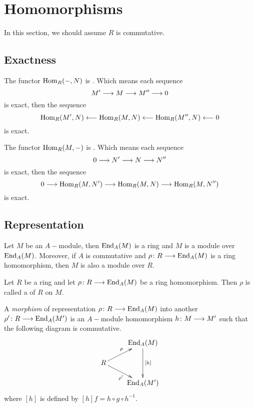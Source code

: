 \newpage\section{Homomorphisms}
In this section, we should assume $R$ is commutative.
\subsection{Exactness}
  \begin{prop}
    The functor $\operatorname{Hom}_R(-,N)$ is . Which means each sequence
    \begin{equation*}
      M'\longrightarrow M\longrightarrow M''\longrightarrow 0
    \end{equation*}
    is exact, then the sequence
    \begin{equation*}
      \operatorname{Hom}_R(M',N)\longleftarrow \operatorname{Hom}_R(M,N)\longleftarrow \operatorname{Hom}_R(M'',N)\longleftarrow 0
    \end{equation*}
    is exact.
  \end{prop}
  \begin{prop}
    The functor $\operatorname{Hom}_R(M,-)$ is . Which means each sequence
    \begin{equation*}
      0\longrightarrow N'\longrightarrow N\longrightarrow N''
    \end{equation*}
    is exact, then the sequence
    \begin{equation*}
      0\longrightarrow \operatorname{Hom}_R(M,N')\longrightarrow \operatorname{Hom}_R(M,N)\longrightarrow \operatorname{Hom}_R(M,N'')
    \end{equation*}
    is exact.
  \end{prop}

\subsection{Representation}

  Let $M$ be an $A-$module, then $\operatorname{End}_A(M)$ is a ring and $M$ is a module over $\operatorname{End}_A(M)$. Moreover, if $A$ is commutative and $\rho\colon R\longrightarrow \operatorname{End}_A(M)$ is a ring homomorphism, then $M$ is also a module over $R$.
  \begin{defn}
    Let $R$ be a ring and let $\rho\colon R\longrightarrow \operatorname{End}_A(M)$ be a ring homomorphism. Then $\rho$ is called a  of $R$ on $M$.
  \end{defn}

  \begin{defn}
    A \emph{morphism} of representation $\rho\colon R\longrightarrow \operatorname{End}_A(M)$ into another $\rho'\colon R\longrightarrow \operatorname{End}_A(M')$ is an $A-$module homomorphism $h\colon M\longrightarrow M'$ such that the following diagram is commutative.
    \begin{displaymath}
      \xymatrix@R=0.5cm{
                &         \End_A(M) \ar[dd]^{[h]}     \\
              R \ar[ur]^{\rho} \ar[dr]_{\rho'}                 \\
                &         \End_A(M')                 }
    \end{displaymath}
    where $[h]$ is defined by $[h]f=h\circ g\circ h^{-1}$.
  \end{defn}


